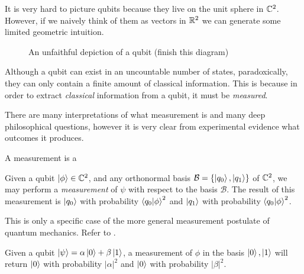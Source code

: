         
      

        It is very hard to picture qubits because they live on the unit sphere in $\mathbb{C}^2$. However, if we naively 
        think of them as vectors in $\mathbb{R}^2$ we can generate some limited geometric intuition. 
        
        \begin{figure}[h]
            \centering
            \begin{center}
            \end{center}
            \caption{An unfaithful depiction of a qubit (finish this diagram)}
        \end{figure}
        
        Although a qubit can exist in an uncountable number of states, paradoxically, they can only contain a 
        finite amount of classical information. This is because in order to extract \emph{classical} information 
        from a qubit, it must be \emph{measured}. 
        
        There are many interpretations of what measurement is and many deep philosophical questions, however it is 
        very clear from experimental evidence what outcomes it produces.
        
        
        \begin{definition}
            A measurement is a 
        \end{definition}

        \begin{postulate}
            Given a qubit $\ket{\phi} \in \mathbb{C}^{2}$, and any orthonormal basis $ \mathcal{B} = \{\ket{q_0}, \ket{q_1 
            }\}$ of $ \mathbb{C}^2$, we may perform a \emph{measurement} of $\psi$ with respect to the basis $\mathcal{B}$.  
            The result of this measurement is $\ket{q_0}$ with probability $\braket{q_0 | \phi }^2$ and $\ket{q_1}$ 
            with probability $\braket{q_0 | \phi }^2$.
        \end{postulate}
        
        This is only a specific case of the more general measurement postulate of quantum mechanics. Refer to 
        \cite{Nielsen&Chuang}.

        \begin{example}
            Given a qubit $\ket{\psi} = \alpha\ket{0} + \beta\ket{1}$, a measurement of $\phi$ in the basis 
            $\ket{0}, \ket{1}$ will return $\ket{0}$ with probability $ | \alpha |^2$  and $\ket{0}$ with 
            probability
            $ |\beta|^2 $.
        \end{example}

